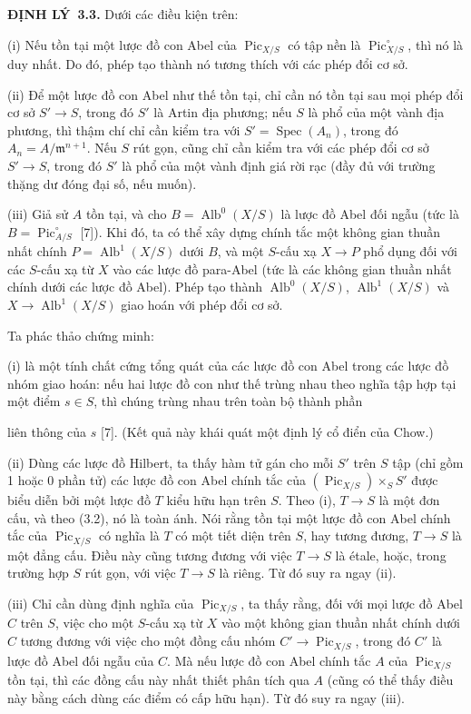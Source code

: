 \documentclass[11pt,twoside,openany]{book}
\numberwithin{equation}{section}
\newcommand{\src}[1]{%
  \phantomsection\hypertarget{src:\fgasourceid:#1}{}%
  \marginpar{\raggedleft\footnotesize\sffamily #1}%
}
\newcommand{\fgasourceid}{unset}
\newcommand{\result}[2]{\par\medskip\noindent\textbf{#1\if\relax\detokenize{#2}\relax\else\ #2\fi.}\quad}
\begin{document}
\result{ĐỊNH LÝ}{3.3} Dưới các điều kiện trên:

\noindent(i) Nếu tồn tại một lược đồ con Abel của
$\operatorname{Pic}_{X/S}$ có tập nền là
$\operatorname{Pic}_{X/S}^\circ$, thì nó là duy nhất. Do đó, phép tạo thành
nó tương thích với các phép đổi cơ sở.

\noindent(ii) Để một lược đồ con Abel như thế tồn tại, chỉ cần nó tồn tại sau
mọi phép đổi cơ sở $S'\longrightarrow S$, trong đó $S'$ là Artin địa phương;
nếu $S$ là phổ của một vành địa phương, thì thậm chí chỉ cần kiểm tra với
$S'=\operatorname{Spec}(A_n)$, trong đó
$A_n=A/\mathfrak m^{n+1}$. Nếu $S$ rút gọn, cũng chỉ cần kiểm tra với các phép
đổi cơ sở $S'\longrightarrow S$, trong đó $S'$ là phổ của một vành định giá
rời rạc (đầy đủ với trường thặng dư đóng đại số, nếu muốn).

\noindent(iii) Giả sử $A$ tồn tại, và cho
$B=\operatorname{Alb}^0(X/S)$ là lược đồ Abel đối ngẫu (tức là
$B=\operatorname{Pic}_{A/S}^\circ$ [7]). Khi đó, ta có thể xây dựng chính tắc
một không gian thuần nhất chính $P=\operatorname{Alb}^1(X/S)$ dưới $B$, và
một $S$-cấu xạ $X\longrightarrow P$ phổ dụng đối với các $S$-cấu xạ từ $X$
vào các lược đồ para-Abel (tức là các không gian thuần nhất chính dưới các
lược đồ Abel). Phép tạo thành $\operatorname{Alb}^0(X/S)$,
$\operatorname{Alb}^1(X/S)$ và
$X\longrightarrow\operatorname{Alb}^1(X/S)$ giao hoán với phép đổi cơ sở.

Ta phác thảo chứng minh:

(i) là một tính chất cứng tổng quát của các lược đồ con Abel trong các lược đồ
nhóm giao hoán: nếu hai lược đồ con như thế trùng nhau theo nghĩa tập hợp tại
một điểm $s\in S$, thì chúng trùng nhau trên toàn bộ thành phần
\src{238}
liên thông của $s$ [7]. (Kết quả này khái quát một định lý cổ điển của Chow.)

(ii) Dùng các lược đồ Hilbert, ta thấy hàm tử gán cho mỗi $S'$ trên $S$ tập
(chỉ gồm 1 hoặc 0 phần tử) các lược đồ con Abel chính tắc của
$(\operatorname{Pic}_{X/S})\times_S S'$ được biểu diễn bởi một lược đồ $T$
kiểu hữu hạn trên $S$. Theo (i), $T\longrightarrow S$ là một đơn cấu, và theo
(3.2), nó là toàn ánh. Nói rằng tồn tại một lược đồ con Abel chính tắc của
$\operatorname{Pic}_{X/S}$ có nghĩa là $T$ có một tiết diện trên $S$, hay
tương đương, $T\longrightarrow S$ là một đẳng cấu. Điều này cũng tương đương
với việc $T\longrightarrow S$ là étale, hoặc, trong trường hợp $S$ rút gọn,
với việc $T\longrightarrow S$ là riêng. Từ đó suy ra ngay (ii).

(iii) Chỉ cần dùng định nghĩa của $\operatorname{Pic}_{X/S}$, ta thấy rằng,
đối với mọi lược đồ Abel $C$ trên $S$, việc cho một $S$-cấu xạ từ $X$ vào một
không gian thuần nhất chính dưới $C$ tương đương với việc cho một đồng cấu nhóm
$C'\longrightarrow\operatorname{Pic}_{X/S}$, trong đó $C'$ là lược đồ Abel
đối ngẫu của $C$. Mà nếu lược đồ con Abel chính tắc $A$ của
$\operatorname{Pic}_{X/S}$ tồn tại, thì các đồng cấu này nhất thiết phân tích
qua $A$ (cũng có thể thấy điều này bằng cách dùng các điểm có cấp hữu hạn). Từ
đó suy ra ngay (iii).
\end{document}
